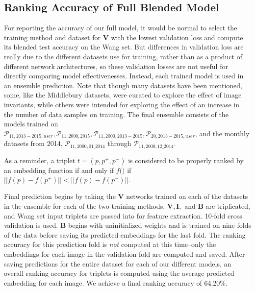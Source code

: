 \subsection{Ranking Accuracy of Full Blended Model}
For reporting the accuracy of our full model, it would be normal to select the training method and dataset for $\mathbf{V}$ with the lowest validation loss and compute its blended test accuracy on the Wang set. But differences in validation loss are really due to the different datasets use for training, rather than as a product of different network architectures, so these validation losses are not useful for directly comparing model effectivenesses. Instead, each trained model is used in an ensemble prediction. Note that though many datasets have been mentioned, some, like the Middlebury datasets, were curated to explore the effect of image invariants, while others were intended for exploring the effect of an increase in the number of data samples on training. The final ensemble consists of the models trained on $\mathcal{P}_{11,2013-2015,user}, \mathcal{P}_{11,2000,2015}, \mathcal{P}_{11,2000,2013-2015}, \mathcal{P}_{20,2013-2015,user}$, and the monthly datasets from 2014, $\mathcal{P}_{11,2000,01\_2014}$ through $\mathcal{P}_{11,2000,12\_2014}$.

As a reminder, a triplet $t = (p, p^+, p^-)$ is considered to be properly ranked by an embedding function if and only if $f(\dot)$ if $||f(p) - f(p^+)|| < ||f(p) - f(p^-)||$.

Final prediction begins by taking the $\mathbf{V}$ networks trained on each of the datasets in the ensemble for each of the two training methods. $\mathbf{V}, \mathbf{I}, $ and $\mathbf{B}$ are triplicated, and Wang set input triplets are passed into for feature extraction. 10-fold cross validation is used. $\mathbf{B}$ begins with uninitialized weights and is trained on nine folds of the data before saving its predicted embeddings for the last fold. The ranking accuracy for this prediction fold is \textit{not} computed at this time--only the embeddings for each image in the validation fold are computed and saved. After saving predictions for the entire dataset for each of our different models, an overall ranking accuracy for triplets is computed using the average predicted embedding for each image. We achieve a final ranking accuracy of 64.20\%.

